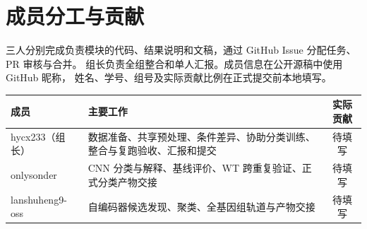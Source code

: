 \section{成员分工与贡献}
三人分别完成负责模块的代码、结果说明和文稿，通过 GitHub Issue 分配任务、PR 审核与合并。
组长负责全组整合和单人汇报。成员信息在公开源稿中使用 GitHub 昵称，
姓名、学号、组号及实际贡献比例在正式提交前本地填写。

\begin{table}[htbp]
\centering
\begin{tabularx}{\linewidth}{l X c}
\toprule
成员 & 主要工作 & 实际贡献 \\
\midrule
hycx233（组长） & 数据准备、共享预处理、条件差异、协助分类训练、整合与复跑验收、汇报和提交 & 待填写 \\
onlysonder & CNN 分类与解释、基线评价、WT 跨重复验证、正式分类产物交接 & 待填写 \\
lanshuheng9-oss & 自编码器候选发现、聚类、全基因组轨道与产物交接 & 待填写 \\
\bottomrule
\end{tabularx}
\end{table}
